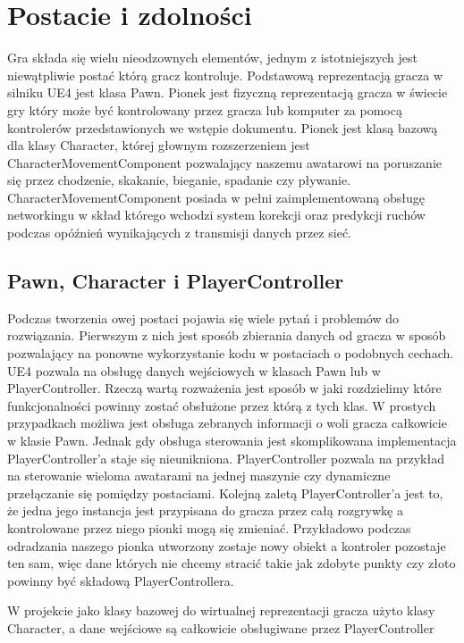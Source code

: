 \documentclass[multip]{SGGW-thesis}
\begin{document}
\section{Postacie i zdolności}
	\label{characters-skills}
Gra składa się wielu nieodzownych elementów, jednym z istotniejszych jest niewątpliwie postać którą gracz kontroluje. Podstawową reprezentacją gracza w silniku UE4 jest klasa Pawn. 
Pionek jest fizyczną reprezentacją gracza w świecie gry który może być kontrolowany przez gracza lub komputer za pomocą kontrolerów przedstawionych we wstępie dokumentu. Pionek jest klasą bazową dla klasy Character, której głownym rozszerzeniem jest CharacterMovementComponent pozwalający naszemu awatarowi na poruszanie się przez chodzenie, skakanie, bieganie, spadanie czy pływanie. CharacterMovementComponent posiada w pełni zaimplementowaną obsługę networkingu w skład którego wchodzi system korekcji oraz predykcji ruchów podczas opóźnień wynikających z transmisji danych przez sieć.
	\subsection{Pawn, Character i PlayerController}
	Podczas tworzenia owej postaci pojawia się wiele pytań i problemów do rozwiązania.
Pierwszym z nich jest sposób zbierania danych od gracza w sposób pozwalający na ponowne wykorzystanie kodu w postaciach o podobnych cechach. UE4 pozwala na obsługę danych wejściowych w klasach Pawn lub w PlayerController. Rzeczą wartą rozważenia jest sposób w jaki rozdzielimy które funkcjonalności powinny zostać obsłużone przez którą z tych klas. W prostych przypadkach możliwa jest obsługa zebranych informacji o woli gracza całkowicie w klasie Pawn. Jednak gdy obsługa sterowania jest skomplikowana implementacja PlayerController’a staje się nieunikniona. PlayerController pozwala na przykład na sterowanie wieloma awatarami na jednej maszynie czy dynamiczne przełączanie się pomiędzy postaciami.  Kolejną zaletą PlayerController’a jest to, że jedna jego instancja jest przypisana do gracza przez całą rozgrywkę a kontrolowane przez niego pionki mogą się zmieniać. Przykładowo podczas odradzania naszego pionka utworzony zostaje nowy obiekt a kontroler pozostaje ten sam, więc dane których nie chcemy stracić takie jak zdobyte punkty czy złoto powinny być składową PlayerControllera.

	W projekcie jako klasy bazowej do wirtualnej reprezentacji gracza użyto klasy Character, a dane wejściowe są całkowicie obsługiwane przez PlayerController
\end{document}
